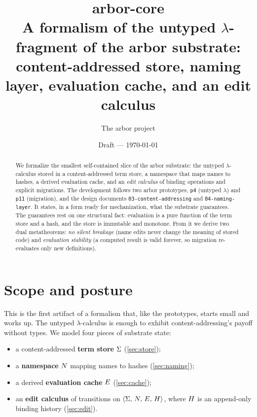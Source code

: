\documentclass[11pt]{article}
\title{\textbf{arbor-core}\\[2pt]
\large A formalism of the untyped $\lambda$-fragment of the arbor substrate:\\
content-addressed store, naming layer, evaluation cache, and an edit calculus}
\author{The arbor project}
\date{Draft --- \today}
\theoremstyle{definition}
\theoremstyle{plain}
\theoremstyle{remark}
\begin{document}
\maketitle

\begin{abstract}
We formalize the smallest self-contained slice of the arbor substrate: the untyped
$\lambda$-calculus stored in a content-addressed term store, a namespace that maps names to
hashes, a derived evaluation cache, and an \emph{edit calculus} of binding operations and
explicit migrations. The development follows two arbor prototypes, \texttt{p4} (untyped
$\lambda$) and \texttt{p11} (migration), and the design documents
\texttt{03-content-addressing} and \texttt{04-naming-layer}. It states, in a form ready for
mechanization, what the substrate guarantees. The guarantees rest on one structural fact:
evaluation is a pure function of the term store and a hash, and the store is immutable and
monotone. From it we derive two dual metatheorems: \emph{no silent breakage} (name edits
never change the meaning of stored code) and \emph{evaluation stability} (a computed result is
valid forever, so migration re-evaluates only new definitions).
\end{abstract}

\tableofcontents

\section{Scope and posture}\label{sec:scope}

This is the first artifact of a formalism that, like the prototypes, starts small and works
up. The untyped $\lambda$-calculus is enough to exhibit content-addressing's payoff without
types. We model four pieces of substrate state:
\begin{itemize}[nosep]
  \item a content-addressed \textbf{term store} $\Sigma$ (\cref{sec:store});
  \item a \textbf{namespace} $N$ mapping names to hashes (\cref{sec:naming});
  \item a derived \textbf{evaluation cache} $E$ (\cref{sec:cache});
  \item an \textbf{edit calculus} of transitions on $\langle \Sigma,\, N,\, E,\, H\rangle$,
  where $H$ is an append-only binding history (\cref{sec:edit}).
\end{itemize}
\end{document}
